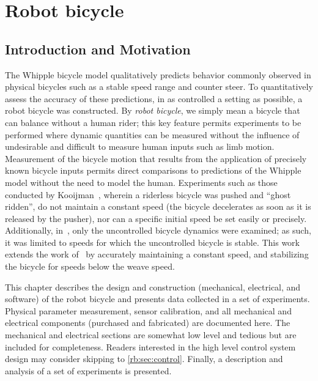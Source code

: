 \chapter{Robot bicycle}

\section{Introduction and Motivation} \label{rb:sec:intro}

The Whipple bicycle model qualitatively predicts behavior commonly observed in
physical bicycles such as a stable speed range and counter steer. To
quantitatively assess the accuracy of these predictions, in as controlled a
setting as possible, a robot bicycle was constructed. By \textit{robot
bicycle}, we simply mean a bicycle that can balance without a human rider; this key
feature permits experiments to be performed where dynamic quantities can be
measured without the influence of undesirable and difficult to measure human
inputs such as limb motion. Measurement of the bicycle motion that results from
the application of precisely known bicycle inputs permits direct comparisons to
predictions of the Whipple model without the need to model the human.
Experiments such as those conducted by Kooijman~\cite{Kooijman2007}, wherein a
riderless bicycle was pushed and ``ghost ridden'', do not maintain a constant
speed (the bicycle decelerates as soon as it is released by the pusher), nor
can a specific initial speed be set easily or precisely. Additionally,
in~\cite{Kooijman2007}, only the uncontrolled bicycle dynamics were examined;
as such, it was limited to speeds for which the uncontrolled bicycle is stable.
This work extends the work of~\cite{Kooijman2007} by accurately maintaining a
constant speed, and stabilizing the bicycle for speeds below the weave speed.


This chapter describes the design and construction (mechanical, electrical, and
software) of the robot bicycle and presents data collected in a set of experiments.
Physical parameter measurement, sensor calibration, and all mechanical and
electrical components (purchased and fabricated) are documented here. The
mechanical and electrical sections are somewhat low level and tedious but are
included for completeness. Readers interested in the high level control system
design may consider skipping to \autoref{rb:sec:control}. Finally, a
description and analysis of a set of experiments is presented.

